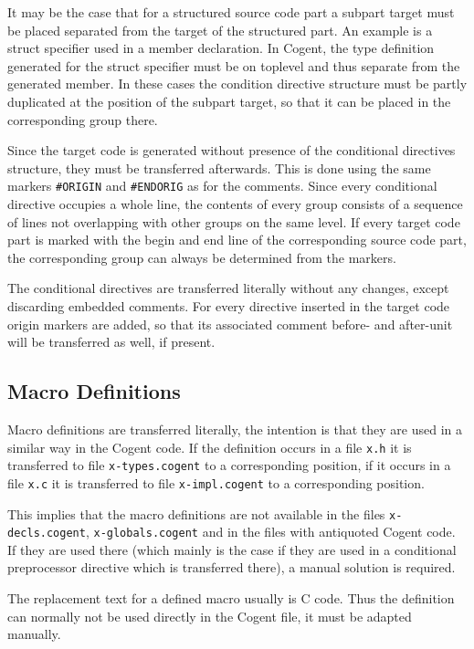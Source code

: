 \documentclass[a4paper]{report}
\newcommand{\code}[1]{\textnormal{\texttt{#1}}}
\begin{document}
It may be the case that for a structured source code part a subpart target must be placed separated from the
target of the structured part. An example is a struct specifier used in a member declaration. In Cogent, the 
type definition generated for the struct specifier must be on toplevel and thus separate from the generated member.
In these cases the condition directive structure must be partly duplicated at the position of the subpart target,
so that it can be placed in the corresponding group there.

Since the target code is generated without presence of the conditional directives structure, they must be 
transferred afterwards. This is done using the same markers \code{\#ORIGIN} and \code{\#ENDORIG} as for the
comments. Since every conditional directive occupies a whole line, the contents of every group consists of
a sequence of lines not overlapping with other groups on the same level. If every target code part is marked 
with the begin and end line of the corresponding source code part, the corresponding group can always be
determined from the markers.

The conditional directives are transferred literally without any changes, except discarding embedded comments. 
For every directive inserted in the target code origin markers are added, so that its associated comment before-
and after-unit will be transferred as well, if present.

\subsection{Macro Definitions}

Macro definitions are transferred literally, the intention is that they are used in a similar way in the Cogent code.
If the definition occurs in a file \code{x.h} it is transferred to file \code{x-types.cogent} to a corresponding position,
if it occurs in a file \code{x.c} it is transferred to file \code{x-impl.cogent} to a corresponding position.

This implies that the macro definitions are not available in the files \code{x-decls.cogent}, 
\code{x-globals.cogent} and in the files with
antiquoted Cogent code. If they are used there (which mainly is the case if they are used in a conditional
preprocessor directive which is transferred there), a manual solution is required. 

The replacement text for a defined macro usually is C code. Thus the definition can normally not be used directly in
the Cogent file, it must be adapted manually. 
\end{document}
